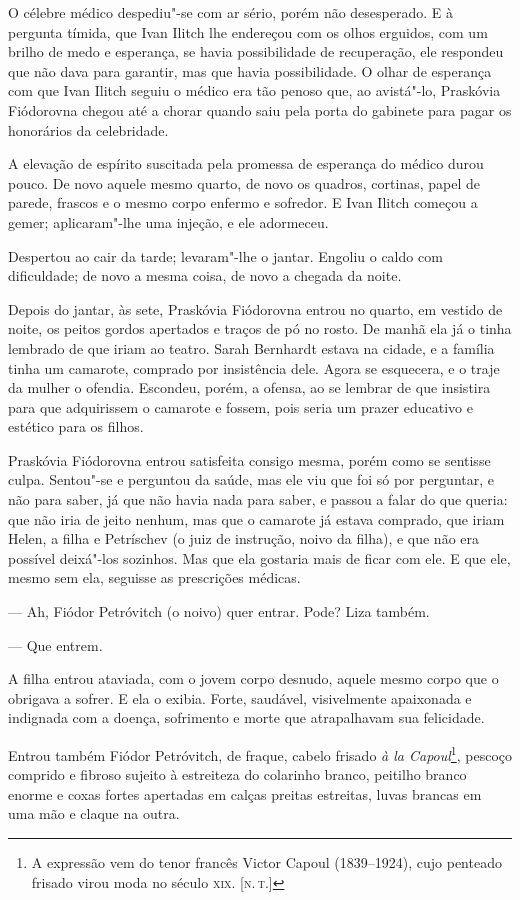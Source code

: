 O célebre médico despediu"-se com ar sério, porém não desesperado. E à
pergunta tímida, que Ivan Ilitch lhe endereçou com os olhos erguidos,
com um brilho de medo e esperança, se havia possibilidade de
recuperação, ele respondeu que não dava para garantir, mas que havia
possibilidade. O olhar de esperança com que Ivan Ilitch seguiu o médico
era tão penoso que, ao avistá"-lo, Praskóvia Fiódorovna chegou até a
chorar quando saiu pela porta do gabinete para pagar os honorários da
celebridade.

A elevação de espírito suscitada pela promessa de esperança do médico
durou pouco. De novo aquele mesmo quarto, de novo os quadros, cortinas,
papel de parede, frascos e o mesmo corpo enfermo e sofredor. E Ivan
Ilitch começou a gemer; aplicaram"-lhe uma injeção, e ele adormeceu.

Despertou ao cair da tarde; levaram"-lhe o jantar. Engoliu o caldo com
dificuldade; de novo a mesma coisa, de novo a chegada da noite.

Depois do jantar, às sete, Praskóvia Fiódorovna entrou no quarto, em
vestido de noite, os peitos gordos apertados e traços de pó no rosto. De
manhã ela já o tinha lembrado de que iriam ao teatro. Sarah Bernhardt
estava na cidade, e a família tinha um camarote, comprado por
insistência dele. Agora se esquecera, e o traje da mulher o ofendia.
Escondeu, porém, a ofensa, ao se lembrar de que insistira para que
adquirissem o camarote e fossem, pois seria um prazer educativo e
estético para os filhos.

Praskóvia Fiódorovna entrou satisfeita consigo mesma, porém como se
sentisse culpa. Sentou"-se e perguntou da saúde, mas ele viu que foi só
por perguntar, e não para saber, já que não havia nada para saber, e
passou a falar do que queria: que não iria de jeito nenhum, mas que o
camarote já estava comprado, que iriam Helen, a filha e Petríschev (o
juiz de instrução, noivo da filha), e que não era possível deixá"-los
sozinhos. Mas que ela gostaria mais de ficar com ele. E que ele, mesmo
sem ela, seguisse as prescrições médicas.

--- Ah, Fiódor Petróvitch (o noivo) quer entrar. Pode? Liza também.

--- Que entrem.

A filha entrou ataviada, com o jovem corpo desnudo, aquele mesmo corpo
que o obrigava a sofrer. E ela o exibia. Forte, saudável, visivelmente
apaixonada e indignada com a doença, sofrimento e morte que atrapalhavam
sua felicidade.

Entrou também Fiódor Petróvitch, de fraque, cabelo frisado \emph{à la
Capoul}\footnote{A expressão vem do tenor francês Victor Capoul
  (1839--1924), cujo penteado frisado virou moda no século \textsc{xix}. {[}\textsc{n.\,t.}{]}}, pescoço comprido e fibroso sujeito à estreiteza do
colarinho branco, peitilho branco enorme e coxas fortes apertadas em
calças preitas estreitas, luvas brancas em uma mão e claque na outra.

